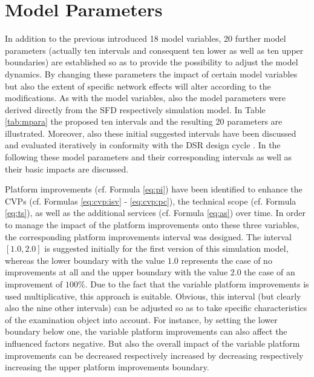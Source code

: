 \section{Model Parameters}\label{ch:sfd:mp}

In addition to the previous introduced 18 model variables, 20 further model parameters (actually ten intervals and consequent ten lower as well as ten upper boundaries) are established so as to provide the possibility to adjust the model dynamics. By changing these parameters the impact of certain model variables but also the extent of specific network effects will alter according to the modifications. As with the model variables, also the model parameters were derived directly from the \ac{SFD} respectively simulation model. In Table \ref{tab:mpara} the proposed ten intervals and the resulting 20 parameters are illustrated. Moreover, also these initial suggested intervals have been discussed and evaluated iteratively in conformity with the \ac{DSR} design cycle \citep{Hevner2007}. In the following these model parameters and their corresponding intervals as well as their basic impacts are discussed.

Platform improvements (cf. Formula \ref{eq:pi}) have been identified to enhance the \acp{CVP} (cf. Formulas \ref{eq:cvp:isv} - \ref{eq:cvp:pc}), the technical scope (cf. Formula \ref{eq:ts}), as well as the additional services (cf. Formula \ref{eq:as}) over time. In order to manage the impact of the platform improvements onto these three variables, the corresponding platform improvements interval was designed. The interval $[1.0,2.0]$ is suggested initially for the first version of this simulation model, whereas the lower boundary with the value $1.0$ represents the case of no improvements at all and the upper boundary with the value $2.0$ the case of an improvement of $100\%$. Due to the fact that the variable platform improvements is used multiplicative, this approach is suitable. Obvious, this interval (but clearly also the nine other intervals) can be adjusted so as to take specific characteristics of the examination object into account. For instance, by setting the lower boundary below one, the variable platform improvements can also affect the influenced factors negative. But also the overall impact of the variable platform improvements can be decreased respectively increased by decreasing respectively increasing the upper platform improvements boundary.

